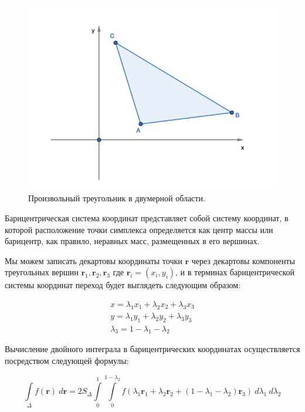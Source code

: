 \documentclass[14pt]{extreport}
\begin{document}
\begin{figure}[H]
\centerline{
\includegraphics[width=0.8\linewidth]{images/triangle}}
\caption{Произвольный треугольник в двумерной области.}
\label{img:integrate:triangle}
\end{figure}

Барицентрическая система координат представляет собой систему координат, в которой расположение точки симплекса определяется как центр массы или барицентр, как правило, неравных масс, размещенных в его вершинах. 

Мы можем записать декартовы координаты точки $\mathbf{r}$ через декартовы компоненты треугольных вершин $\mathbf{r}_1, \mathbf{r}_2, \mathbf{r}_3$ где $\mathbf{r}_i = (x_i, y_i)$, и в терминах барицентрической системы координат переход будет выглядеть следующим образом:

\begin{eqnarray}
x = \lambda_{1} x_{1} +  \lambda_{2} x_{2} +  \lambda_{3} x_{3} \\
y = \lambda_{1} y_{1} +  \lambda_{2} y_{2} +  \lambda_{3} y_{3} \\
\lambda_{3} = 1 - \lambda_{1} - \lambda_{2}
\end{eqnarray}

Вычисление двойного интеграла в барицентрических координатах осуществляется посредством следующей формулы\cite{bib:calc:barycentric}:

\begin{equation}
\int\limits_{\Delta} f(\mathbf{r}) \ d\mathbf{r} = 2S_{\Delta} \int\limits_{0}^{1} \int\limits_{0}^{1 - \lambda_{2}} f(\lambda_{1} \mathbf{r}_{1} + \lambda_{2} \mathbf{r}_{2} +
(1 - \lambda_{1} - \lambda_{2}) \mathbf{r}_{3}) \ d\lambda_{1} \ d\lambda_{2}
\end{equation}
\end{document}
